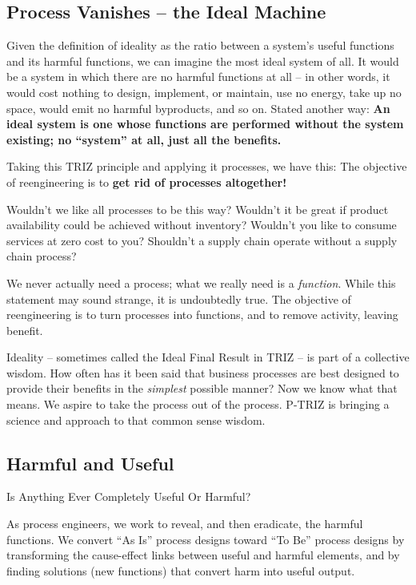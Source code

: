 \documentclass[11pt,a4paper]{article}
\begin{document}
\subsection{Process Vanishes -- the Ideal Machine}

Given the definition of ideality as the ratio between a system’s useful
functions and its harmful functions, we can imagine the most ideal system of
all. It would be a system in which there are no harmful functions at all – in
other words, it would cost nothing to design, implement, or maintain, use no
energy, take up no space, would emit no harmful byproducts, and so on. Stated
another way: \textbf{An ideal system is one whose functions are performed
  without the system existing; no “system” at all, just all the benefits.}

Taking this TRIZ principle and applying it processes, we have this: The
objective of reengineering is to \textbf{get rid of processes altogether!}

Wouldn’t we like all processes to be this way? Wouldn’t it be great if product
availability could be achieved without inventory? Wouldn’t you like to consume
services at zero cost to you? Shouldn’t a supply chain operate without a
supply chain process?

We never actually need a process; what we really need is a \emph{function}.
While this statement may sound strange, it is undoubtedly true. The objective
of reengineering is to turn processes into functions, and to remove activity,
leaving benefit.

Ideality – sometimes called the Ideal Final Result in TRIZ – is part of a
collective wisdom. How often has it been said that business processes are best
designed to provide their benefits in the \emph{simplest} possible manner? Now
we know what that means. We aspire to take the process out of the process.
P-TRIZ is bringing a science and approach to that common sense wisdom.

\subsection{Harmful and Useful}

Is Anything Ever Completely Useful Or Harmful?

As process engineers, we work to reveal, and then eradicate, the harmful
functions. We convert “As Is” process designs toward “To Be” process designs
by transforming the cause-effect links between useful and harmful elements,
and by finding solutions (new functions) that convert harm into useful output.
\end{document}
